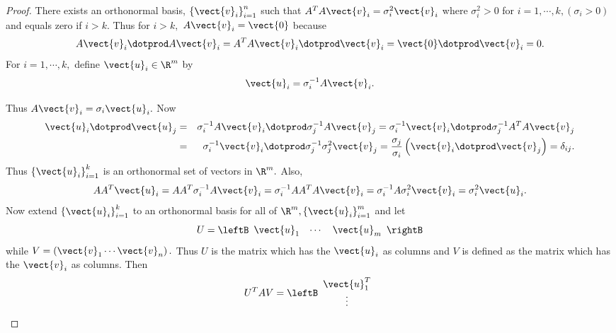 \begin{proof}
There exists an orthonormal basis, $\left\{ \vect{v}_{i}\right\} _{i=1}^{n}$ such that $
A^TA\vect{v}_{i}=\sigma _{i}^{2}\vect{v}_{i}$ where $\sigma
_{i}^{2}>0$ for $i=1,\cdots ,k,\left( \sigma _{i}>0\right) $ and equals zero
if $i>k.$ Thus for $i>k,$ $A\vect{v}_{i}=\vect{0}$ because 
\begin{equation*}
 A\vect{v}_{i}\dotprod A\vect{v}_{i} = A^TA\vect{v}_{i} \dotprod \vect{v}_{i}  = \vect{0} \dotprod \vect{v}_{i} =0.
\end{equation*}
For $i=1,\cdots ,k,$ define $\vect{u}_{i}\in \R^{m}$ by 
\begin{equation*}
\vect{u}_{i}= \sigma _{i}^{-1}A\vect{v}_{i}.
\end{equation*}

Thus $A\vect{v}_{i}=\sigma _{i}\vect{u}_{i}.$ Now 
\begin{eqnarray*}
\vect{u}_{i} \dotprod \vect{u}_{j} &=&  \sigma _{i}^{-1}A
\vect{v}_{i} \dotprod \sigma _{j}^{-1}A\vect{v}_{j}  = \sigma_{i}^{-1}\vect{v}_{i} \dotprod \sigma _{j}^{-1}A^TA\vect{v}_{j} \\
&=& \sigma _{i}^{-1}\vect{v}_{i} \dotprod \sigma _{j}^{-1}\sigma _{j}^{2} \vect{v}_{j} =
\frac{\sigma _{j}}{\sigma _{i}}\left( \vect{v}_{i} \dotprod \vect{v}_{j}\right)
=\delta _{ij}.
\end{eqnarray*}
Thus $\left\{ \vect{u}_{i}\right\} _{i=1}^{k}$ is an orthonormal set of
vectors in $\R^{m}.$ Also, 
\begin{equation*}
AA^T\vect{u}_{i}=AA^T\sigma _{i}^{-1}A\vect{v}_{i}=\sigma
_{i}^{-1}AA^TA\vect{v}_{i}=\sigma _{i}^{-1}A\sigma _{i}^{2}\vect{v}
_{i}=\sigma _{i}^{2}\vect{u}_{i}.
\end{equation*}
Now extend $\left\{ \vect{u}_{i}\right\} _{i=1}^{k}$ to an orthonormal
basis for all of $\R^{m},\left\{ \vect{u}_{i}\right\} _{i=1}^{m}$
and let 
\begin{equation*}
U= \leftB 
\begin{array}{ccc}
\vect{u}_{1} & \cdots & \vect{u}_{m}
\end{array}
\rightB
\end{equation*}
while $V= \left( \vect{v}_{1}\cdots \vect{v}_{n}\right) .$ Thus $U$
is the matrix which has the $\vect{u}_{i}$ as columns and $V$ is defined
as the matrix which has the $\vect{v}_{i}$ as columns. Then 
\begin{equation*}
U^TAV=\leftB 
\begin{array}{c}
\vect{u}_{1}^T \\ 
\vdots \\ 

\end{array}
\end{equation*}
\end{proof}
